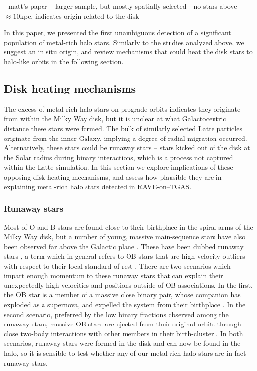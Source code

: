\documentclass[apj, twocolappendix, numberedappendix, appendixfloats]{emulateapj}
\begin{document}
- matt's paper -- larger sample, but mostly spatially selected
- no stars above $\approx10$\;kpc, indicates origin related to the disk

In this paper, we presented the first unambiguous detection of a significant population of metal-rich halo stars.
Similarly to the studies analyzed above, we suggest an in situ origin, and review mechanisms that could heat the disk stars to halo-like orbits in the following section.


\subsection{Disk heating mechanisms}
\label{sec:diskheating}
The excess of metal-rich halo stars on prograde orbits indicates they originate from within the Milky Way disk, but it is unclear at what Galactocentric distance these stars were formed.
The bulk of similarly selected Latte particles originate from the inner Galaxy, implying a degree of radial migration occurred.
Alternatively, these stars could be runaway stars -- stars kicked out of the disk at the Solar radius during binary interactions, which is a process not captured within the Latte simulation.
In this section we explore implications of these opposing disk heating mechanisms, and assess how plausible they are in explaining metal-rich halo stars detected in RAVE-on--TGAS.

\subsubsection{Runaway stars}
\label{sec:runaway}
Most of O and B stars are found close to their birthplace in the spiral arms of the Milky Way disk, but a number of young, massive main-sequence stars have also been observed far above the Galactic plane \citep[][and references therein]{tobin1981}.
These have been dubbed runaway stars \citep{blaauw1961}, a term which in general refers to OB stars that are high-velocity outliers with respect to their local standard of rest \citep[e.g.,][]{feast1965}.
There are two scenarios which impart enough momentum to these runaway stars that can explain their unexpectedly high velocities and positions outside of OB associations.
In the first, the OB star is a member of a massive close binary pair, whose companion has exploded as a supernova, and expelled the system from their birthplace \citep{vdheuvel1981}. 
In the second scenario, preferred by the low binary fractions observed among the runaway stars, massive OB stars are ejected from their original orbits through close two-body interactions with other members in their birth-cluster \citep{gies1986, conlon1990}.
In both scenarios, runaway stars were formed in the disk and can now be found in the halo, so it is sensible to test whether any of our metal-rich halo stars are in fact runaway stars.
\end{document}
